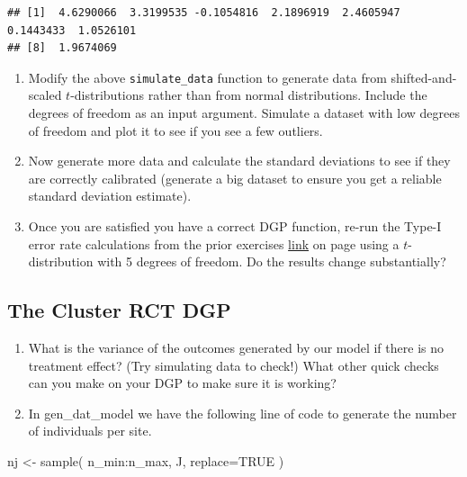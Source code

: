 \documentclass[
]{book}
\newenvironment{Shaded}{\begin{snugshade}}{\end{snugshade}}
\newcommand{\AttributeTok}[1]{\textcolor[rgb]{0.77,0.63,0.00}{#1}}
\newcommand{\ConstantTok}[1]{\textcolor[rgb]{0.00,0.00,0.00}{#1}}
\newcommand{\FunctionTok}[1]{\textcolor[rgb]{0.00,0.00,0.00}{#1}}
\newcommand{\NormalTok}[1]{#1}
\newcommand{\OtherTok}[1]{\textcolor[rgb]{0.56,0.35,0.01}{#1}}
\newcommand{\SpecialCharTok}[1]{\textcolor[rgb]{0.00,0.00,0.00}{#1}}
\begin{document}
\begin{verbatim}
## [1]  4.6290066  3.3199535 -0.1054816  2.1896919  2.4605947  0.1443433  1.0526101
## [8]  1.9674069
\end{verbatim}

\begin{enumerate}
\def\labelenumi{\arabic{enumi}.}
\item
  Modify the above \texttt{simulate\_data} function to generate data from shifted-and-scaled \(t\)-distributions rather than from normal distributions. Include the degrees of freedom as an input argument.
  Simulate a dataset with low degrees of freedom and plot it to see if you see a few outliers.
\item
  Now generate more data and calculate the standard deviations to see if they are correctly calibrated (generate a big dataset to ensure you get a reliable standard deviation estimate).
\item
  Once you are satisfied you have a correct DGP function, re-run the Type-I error rate calculations from the prior exercises \protect\hyperlink{exAnovaExercises}{link} on page \citet{exAnovaExercises} using a \(t\)-distribution with 5 degrees of freedom.
  Do the results change substantially?
\end{enumerate}

\hypertarget{the-cluster-rct-dgp}{%
\subsection{The Cluster RCT DGP}\label{the-cluster-rct-dgp}}

\begin{enumerate}
\def\labelenumi{\arabic{enumi}.}
\setcounter{enumi}{3}
\item
  What is the variance of the outcomes generated by our model if there is no treatment effect? (Try simulating data to check!) What other quick checks can you make on your DGP to make sure it is working?
\item
  In gen\_dat\_model we have the following line of code to generate the number of individuals per site.
\end{enumerate}

\begin{Shaded}
\begin{Highlighting}[]
\NormalTok{nj }\OtherTok{\textless{}{-}} \FunctionTok{sample}\NormalTok{( n\_min}\SpecialCharTok{:}\NormalTok{n\_max, J, }
                 \AttributeTok{replace=}\ConstantTok{TRUE}\NormalTok{ )}
\end{Highlighting}
\end{Shaded}
\end{document}

